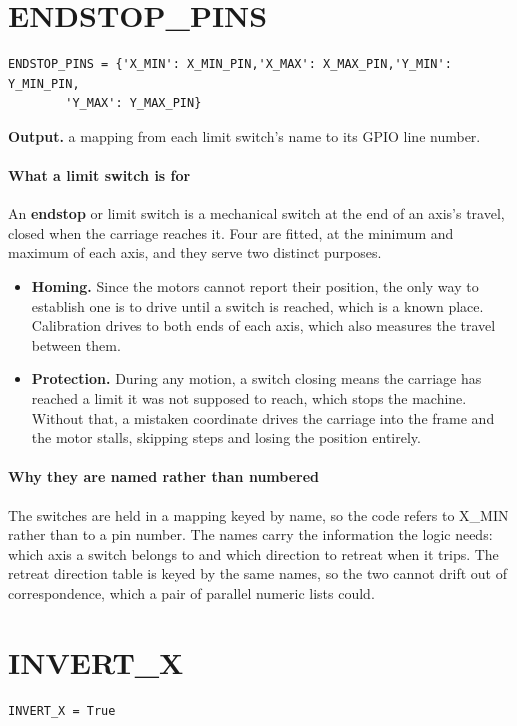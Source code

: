 \section{ENDSTOP\_PINS}
\begin{lstlisting}[style=sig]
ENDSTOP_PINS = {'X_MIN': X_MIN_PIN,'X_MAX': X_MAX_PIN,'Y_MIN': Y_MIN_PIN,
        'Y_MAX': Y_MAX_PIN}
\end{lstlisting}

\noindent\textbf{Output.} a mapping from each limit switch's name to its GPIO line number.


\paragraph{What a limit switch is for}
An \textbf{endstop} or limit switch is a mechanical switch at the end of an axis's travel, closed when the carriage reaches it. Four are fitted, at the minimum and maximum of each axis, and they serve two distinct purposes.


\begin{itemize}\setlength\itemsep{0pt}
  \item \textbf{Homing.} Since the motors cannot report their position, the only way to establish one is to drive until a switch is reached, which is a known place. Calibration drives to both ends of each axis, which also measures the travel between them.
  \item \textbf{Protection.} During any motion, a switch closing means the carriage has reached a limit it was not supposed to reach, which stops the machine. Without that, a mistaken coordinate drives the carriage into the frame and the motor stalls, skipping steps and losing the position entirely.
\end{itemize}

\paragraph{Why they are named rather than numbered}
The switches are held in a mapping keyed by name, so the code refers to X\_MIN rather than to a pin number. The names carry the information the logic needs: which axis a switch belongs to and which direction to retreat when it trips. The retreat direction table is keyed by the same names, so the two cannot drift out of correspondence, which a pair of parallel numeric lists could.


\section{INVERT\_X}
\begin{lstlisting}[style=sig]
INVERT_X = True
\end{lstlisting}

